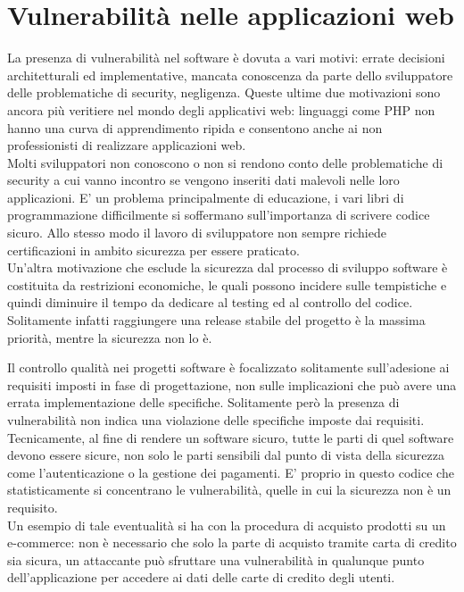 \section{Vulnerabilità nelle applicazioni web}
La presenza di vulnerabilità nel software è dovuta a vari motivi: errate decisioni architetturali ed implementative, mancata conoscenza da parte dello sviluppatore delle problematiche di security, negligenza. Queste ultime due motivazioni sono ancora più veritiere nel mondo degli applicativi web: linguaggi come PHP non hanno una curva di apprendimento ripida e consentono anche ai non professionisti di realizzare applicazioni web.\\
Molti sviluppatori non conoscono o non si rendono conto delle problematiche di security a cui vanno incontro se vengono inseriti dati malevoli nelle loro applicazioni. E' un problema principalmente di educazione, i vari libri di programmazione difficilmente si soffermano sull'importanza di scrivere codice sicuro. Allo stesso modo il lavoro di sviluppatore non sempre richiede certificazioni in ambito sicurezza per essere praticato.\\
Un'altra motivazione che esclude la sicurezza dal processo di sviluppo software è costituita da restrizioni economiche, le quali possono incidere sulle tempistiche e quindi diminuire il tempo da dedicare al testing ed al controllo del codice. Solitamente infatti raggiungere una release stabile del progetto è la massima priorità, mentre la sicurezza non lo è.

Il controllo qualità nei progetti software è focalizzato solitamente sull'adesione ai requisiti imposti in fase di progettazione, non sulle implicazioni che può avere una errata implementazione delle specifiche. Solitamente però la presenza di vulnerabilità non indica una violazione delle specifiche imposte dai requisiti.\\
Tecnicamente, al fine di rendere un software sicuro, tutte le parti di quel software devono essere sicure, non solo le parti sensibili dal punto di vista della sicurezza come l'autenticazione o la gestione dei pagamenti. E' proprio in questo codice che statisticamente si concentrano le vulnerabilità, quelle in cui la sicurezza non è un requisito. \\
Un esempio di tale eventualità si ha con la procedura di acquisto prodotti su un e-commerce: non è necessario che solo la parte di acquisto tramite carta di credito sia sicura, un attaccante può sfruttare una vulnerabilità in qualunque punto dell'applicazione per accedere ai dati delle carte di credito degli utenti.

